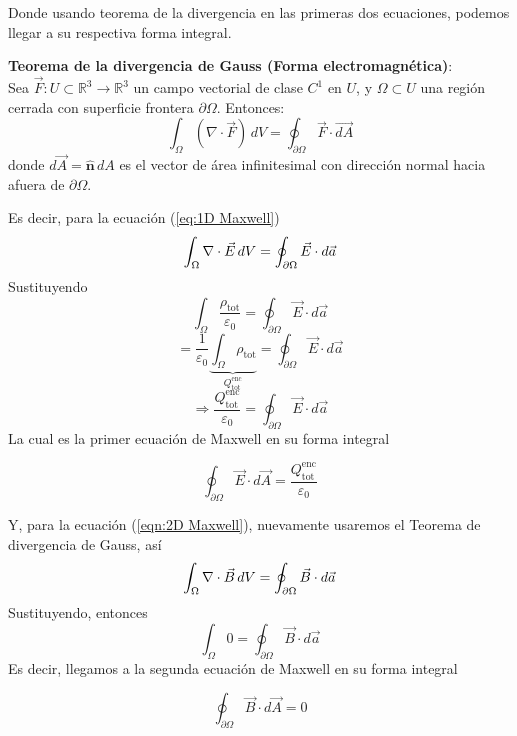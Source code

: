 \documentclass{electro}
\begin{document}
    Donde usando teorema de la divergencia en las primeras dos ecuaciones, podemos llegar a su respectiva forma integral.

    \begin{tcolorbox}[colframe=white, colback=principaluno!40, arc=8pt, left=2mm, right=2mm, top=2mm, bottom=2mm]
    \textbf{Teorema de la divergencia de Gauss (Forma electromagnética)}:\\
    Sea $\vec{F}: U \subset \mathbb{R}^3 \rightarrow \mathbb{R}^3$ un campo vectorial de clase $C^1$ en $U$, y $\Omega \subset U$ una región cerrada con superficie frontera $\partial \Omega$. Entonces:
    \[\int_{\Omega} (\nabla \cdot \vec{F}) \, dV = \oint_{\partial \Omega} \vec{F} \cdot \vec{dA}\]
    donde $d\vec{A} = \mathbf{\hat{n}} \, dA$ es el vector de área infinitesimal con dirección normal hacia afuera de $\partial \Omega$.
    \end{tcolorbox}
    Es decir, para la ecuación (\ref{eq:1D Maxwell})
    \[\int_{\Omega} \nabla \cdot{\vec{E}} \,dV = \oint_{\partial \Omega} \vec{E} \cdot d\vec{a}\]
    Sustituyendo
    \[\int_{\Omega} \frac{\rho_{\text{tot}}}{\varepsilon_0}=\oint_{\partial \Omega} \vec{E} \cdot d\vec{a}\]
    \[=\frac{1}{\varepsilon_0} \underbrace{\int_{\Omega} \rho_{\text{tot}}}_{ Q_{\text{tot}}^{\text{enc}}}=\oint_{\partial\Omega}\vec{E} \cdot d\vec{a}\]
    \[\Rightarrow \frac{Q_{\text{tot}}^{\text{enc}}}{\varepsilon_0}=\oint_{\partial \Omega} \vec{E} \cdot d\vec{a}\]
    La cual es la primer ecuación de Maxwell en su forma integral
    \begin{tcolorbox}[colframe=white, colback=secdos!40, arc=8pt, left=2mm, right=2mm, top=2mm, bottom=2mm]
    \begin{equation}
        \oint_{\partial \Omega} \vec{E} \cdot d\vec{A} = \frac{Q_{\text{tot}}^{\text{enc}}}{\varepsilon_0}
        \tag{Gauss campo eléctrico}
    \end{equation}
    \end{tcolorbox}
    
    Y, para la ecuación (\ref{eqn:2D Maxwell}), nuevamente usaremos el Teorema de divergencia de Gauss, así
    \[\int_{\Omega} \nabla \cdot{\vec{B}} \, dV = \oint_{\partial \Omega} \vec{B} \cdot d\vec{a}\]
    Sustituyendo, entonces
    \[\int_{\Omega} 0 = \oint_{\partial \Omega} \vec{B} \cdot d \vec{a}\]
    Es decir, llegamos a la segunda ecuación de Maxwell en su forma integral
    \begin{tcolorbox}[colframe=white, colback=secdos!40, arc=8pt, left=2mm, right=2mm, top=2mm, bottom=2mm]
    \begin{equation}
        \oint_{\partial \Omega} \vec{B} \cdot d\vec{A} = 0
        \tag{Gauss campo magnético}
    \end{equation}
    \end{tcolorbox}
    
\end{document}
